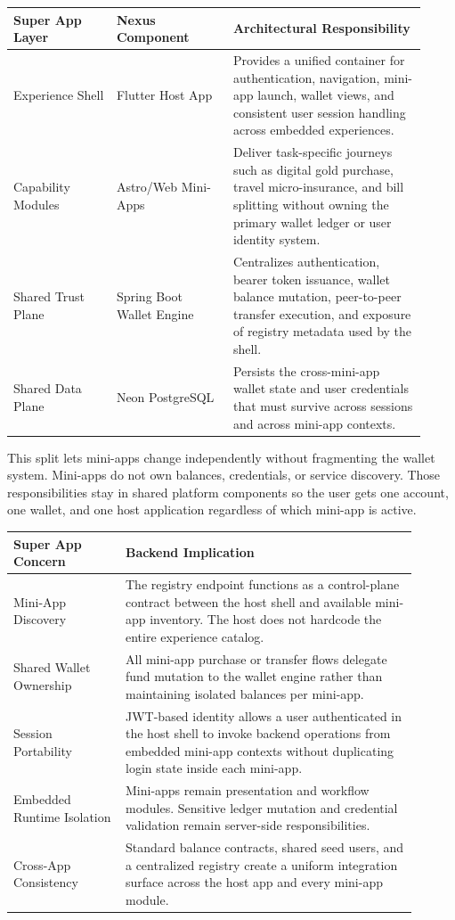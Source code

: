 \documentclass[11pt,a4paper]{article}
\begin{document}
\begin{longtable}{p{0.23\linewidth} p{0.26\linewidth} p{0.43\linewidth}}
\toprule
\textbf{Super App Layer} & \textbf{Nexus Component} & \textbf{Architectural Responsibility} \\
\midrule
Experience Shell & Flutter Host App & Provides a unified container for authentication, navigation, mini-app launch, wallet views, and consistent user session handling across embedded experiences. \\
Capability Modules & Astro/Web Mini-Apps & Deliver task-specific journeys such as digital gold purchase, travel micro-insurance, and bill splitting without owning the primary wallet ledger or user identity system. \\
Shared Trust Plane & Spring Boot Wallet Engine & Centralizes authentication, bearer token issuance, wallet balance mutation, peer-to-peer transfer execution, and exposure of registry metadata used by the shell. \\
Shared Data Plane & Neon PostgreSQL & Persists the cross-mini-app wallet state and user credentials that must survive across sessions and across mini-app contexts. \\
\bottomrule
\end{longtable}

This split lets mini-apps change independently without fragmenting the wallet system. Mini-apps do not own balances, credentials, or service discovery. Those responsibilities stay in shared platform components so the user gets one account, one wallet, and one host application regardless of which mini-app is active.

\begin{longtable}{p{0.25\linewidth} p{0.65\linewidth}}
\toprule
\textbf{Super App Concern} & \textbf{Backend Implication} \\
\midrule
Mini-App Discovery & The registry endpoint functions as a control-plane contract between the host shell and available mini-app inventory. The host does not hardcode the entire experience catalog. \\
Shared Wallet Ownership & All mini-app purchase or transfer flows delegate fund mutation to the wallet engine rather than maintaining isolated balances per mini-app. \\
Session Portability & JWT-based identity allows a user authenticated in the host shell to invoke backend operations from embedded mini-app contexts without duplicating login state inside each mini-app. \\
Embedded Runtime Isolation & Mini-apps remain presentation and workflow modules. Sensitive ledger mutation and credential validation remain server-side responsibilities. \\
Cross-App Consistency & Standard balance contracts, shared seed users, and a centralized registry create a uniform integration surface across the host app and every mini-app module. \\
\bottomrule
\end{longtable}
\end{document}
